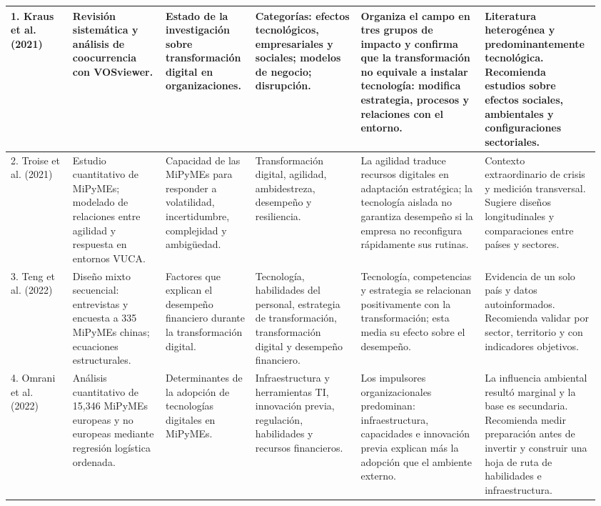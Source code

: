\documentclass[spanish,letterpaper,oneside]{article}
\begin{document}
\begin{landscape}
\begin{longtable}{@{}p{0.105\linewidth}p{0.155\linewidth}p{0.145\linewidth}p{0.17\linewidth}p{0.205\linewidth}p{0.18\linewidth}@{}}
1. Kraus et al. (2021) & Revisión sistemática y análisis de coocurrencia con VOSviewer. & Estado de la investigación sobre transformación digital en organizaciones. & Categorías: efectos tecnológicos, empresariales y sociales; modelos de negocio; disrupción. & Organiza el campo en tres grupos de impacto y confirma que la transformación no equivale a instalar tecnología: modifica estrategia, procesos y relaciones con el entorno. & Literatura heterogénea y predominantemente tecnológica. Recomienda estudios sobre efectos sociales, ambientales y configuraciones sectoriales. \\
\midrule
2. Troise et al. (2021) & Estudio cuantitativo de MiPyMEs; modelado de relaciones entre agilidad y respuesta en entornos VUCA. & Capacidad de las MiPyMEs para responder a volatilidad, incertidumbre, complejidad y ambigüedad. & Transformación digital, agilidad, ambidestreza, desempeño y resiliencia. & La agilidad traduce recursos digitales en adaptación estratégica; la tecnología aislada no garantiza desempeño si la empresa no reconfigura rápidamente sus rutinas. & Contexto extraordinario de crisis y medición transversal. Sugiere diseños longitudinales y comparaciones entre países y sectores. \\
\midrule
3. Teng et al. (2022) & Diseño mixto secuencial: entrevistas y encuesta a 335 MiPyMEs chinas; ecuaciones estructurales. & Factores que explican el desempeño financiero durante la transformación digital. & Tecnología, habilidades del personal, estrategia de transformación, transformación digital y desempeño financiero. & Tecnología, competencias y estrategia se relacionan positivamente con la transformación; esta media su efecto sobre el desempeño. & Evidencia de un solo país y datos autoinformados. Recomienda validar por sector, territorio y con indicadores objetivos. \\
\midrule
4. Omrani et al. (2022) & Análisis cuantitativo de 15,346 MiPyMEs europeas y no europeas mediante regresión logística ordenada. & Determinantes de la adopción de tecnologías digitales en MiPyMEs. & Infraestructura y herramientas TI, innovación previa, regulación, habilidades y recursos financieros. & Los impulsores organizacionales predominan: infraestructura, capacidades e innovación previa explican más la adopción que el ambiente externo. & La influencia ambiental resultó marginal y la base es secundaria. Recomienda medir preparación antes de invertir y construir una hoja de ruta de habilidades e infraestructura. \\
\midrule

\end{longtable}
\end{landscape}
\end{document}
